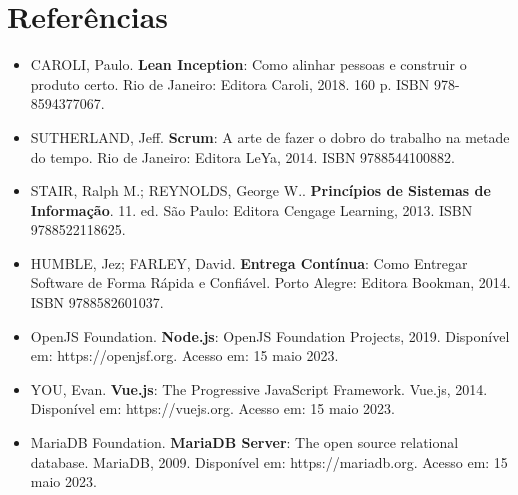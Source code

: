 \section{Referências}
\begin{itemize}
	\item[] CAROLI, Paulo. \textbf{Lean Inception}: Como alinhar pessoas e construir o produto certo. Rio de Janeiro: Editora Caroli, 2018. 160 p. ISBN 978-8594377067.
	\item[] SUTHERLAND, Jeff. \textbf{Scrum}: A arte de fazer o dobro do trabalho na metade do tempo. Rio de Janeiro: Editora LeYa, 2014. ISBN 9788544100882. 
	\item[] STAIR, Ralph M.; REYNOLDS, George W.. \textbf{Princípios de Sistemas de Informação}. 11. ed. São Paulo: Editora Cengage Learning, 2013. ISBN 9788522118625.
	\item[] HUMBLE, Jez; FARLEY, David. \textbf{Entrega Contínua}: Como Entregar Software de Forma Rápida e Confiável. Porto Alegre: Editora Bookman, 2014. ISBN 9788582601037.
	\item[] OpenJS Foundation. \textbf{Node.js}: OpenJS Foundation Projects, 2019. Disponível em: https://openjsf.org. Acesso em: 15 maio 2023.
	\item[] YOU, Evan. \textbf{Vue.js}: The Progressive JavaScript Framework. Vue.js, 2014. Disponível em: https://vuejs.org. Acesso em: 15 maio 2023.
	\item[] MariaDB Foundation. \textbf{MariaDB Server}: The open source relational database. MariaDB, 2009. Disponível em: https://mariadb.org. Acesso em: 15 maio 2023.
\end{itemize}
